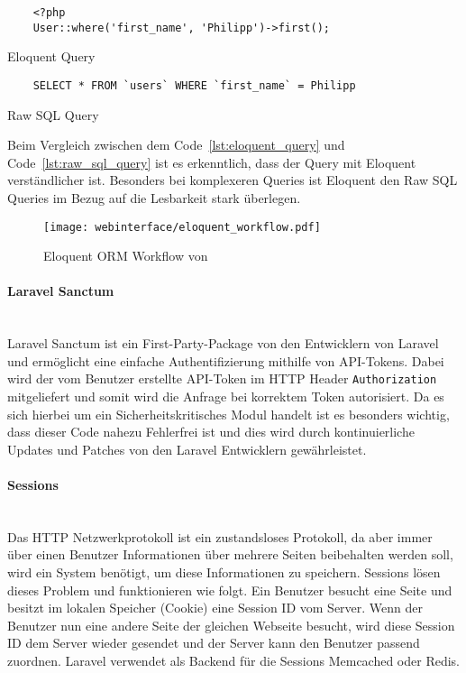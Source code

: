 \begin{listing}[H]
  \begin{verbatim}
    <?php
    User::where('first_name', 'Philipp')->first();
  \end{verbatim}
  \caption{Eloquent Query}
  \label{lst:eloquent_query}
\end{listing}

\begin{listing}[H]
  \begin{verbatim}
    SELECT * FROM `users` WHERE `first_name` = Philipp
  \end{verbatim}
  \caption{Raw SQL Query}
  \label{lst:raw_sql_query}
\end{listing}

Beim Vergleich zwischen dem Code~\ref{lst:eloquent_query} und
Code~\ref{lst:raw_sql_query} ist es erkenntlich, dass der Query mit Eloquent
verständlicher ist. Besonders bei komplexeren Queries ist Eloquent den Raw
\acs*{SQL} Queries im Bezug auf die Lesbarkeit stark überlegen.

\begin{figure}[H]
  \centering
  \texttt{[image: webinterface/eloquent\_workflow.pdf]}
  \caption{Eloquent ORM Workflow von }
\end{figure}

\paragraph{Laravel Sanctum}\mbox{}\\
Laravel Sanctum ist ein First-Party-Package von den Entwicklern von Laravel und
ermöglicht eine einfache Authentifizierung mithilfe von API-Tokens. Dabei wird
der vom Benutzer erstellte API-Token im HTTP Header \verb|Authorization|
mitgeliefert und somit wird die Anfrage bei korrektem Token autorisiert. Da es sich hierbei um ein
Sicherheitskritisches Modul handelt ist es besonders wichtig, dass dieser Code
nahezu Fehlerfrei ist und dies wird durch kontinuierliche Updates und Patches
von den Laravel Entwicklern gewährleistet.
 
\paragraph{Sessions}\mbox{}\\
Das HTTP Netzwerkprotokoll ist ein zustandsloses Protokoll, da aber immer über
einen Benutzer Informationen über mehrere Seiten beibehalten werden soll, wird
ein System benötigt, um diese Informationen zu speichern. Sessions lösen dieses
Problem und funktionieren wie folgt. Ein Benutzer besucht eine Seite und besitzt
im lokalen Speicher (Cookie) eine Session ID vom Server. Wenn der Benutzer nun
eine andere Seite der gleichen Webseite besucht, wird diese Session ID dem Server
wieder gesendet und der Server kann den Benutzer passend zuordnen. Laravel verwendet als Backend
für die Sessions Memcached oder Redis.

